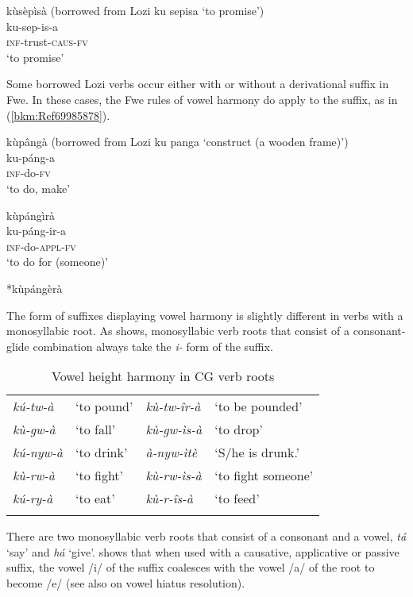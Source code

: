 \ea
\label{bkm:Ref98929085}
kùsèpìsà (borrowed from Lozi ku sepisa ‘to promise’)\\
ku-sep-is-a\\
\textsc{inf}-trust-\textsc{caus}-\textsc{fv}\\
\glt ‘to promise’
\z

Some borrowed Lozi verbs occur either with or without a derivational suffix in Fwe. In these cases, the Fwe rules of vowel harmony do apply to the suffix, as in (\ref{bkm:Ref69985878}).

\ea
\label{bkm:Ref69985878}
\ea
kùpângà (borrowed from Lozi ku panga ‘construct (a wooden frame)’)\\
ku-páng-a\\
\textsc{inf}-do-\textsc{fv}\\
\glt ‘to do, make’

\ex
\glll kùpángìrà\\
ku-páng-ir-a\\
\textsc{inf}-do-\textsc{appl}-\textsc{fv}\\
\glt ‘to do for (someone)’

\ex
  *kùpángèrà
\z\z

The form of suffixes displaying vowel harmony is slightly different in verbs with a monosyllabic root. As  shows, monosyllabic verb roots that consist of a consonant-glide combination always take the \textit{i-} form of the suffix.

\begin{table}
\label{bkm:Ref98929229}\caption{\label{tab:2:3}Vowel height harmony in CG verb roots}
\begin{tabular}{*4{l}}
\lsptoprule
{\itshape kú-tw-à} & ‘to pound’ & {\itshape kù-tw-îr-à} & ‘to be pounded’\\
{\itshape kù-gw-à} & ‘to fall’ & {\itshape kù-gw-ìs-à} & ‘to drop’\\
{\itshape kú-nyw-à} & ‘to drink’ & {\itshape à-nyw-ìtè} & ‘S/he is drunk.’\\
{\itshape kù-rw-à} & ‘to fight’ & {\itshape kù-rw-ìs-à} & ‘to fight someone’\\
{\itshape kú-ry-à} & ‘to eat’ & {\itshape kù-r-îs-à} & ‘to feed’\\
\lspbottomrule
\end{tabular}
\end{table}

There are two monosyllabic verb roots that consist of a consonant and a vowel, \textit{tá} ‘say’ and \textit{há} ‘give’.  shows that when used with a causative, applicative or passive suffix, the vowel /i/ of the suffix coalesces with the vowel /a/ of the root to become /e/ (see also  on vowel hiatus resolution).

